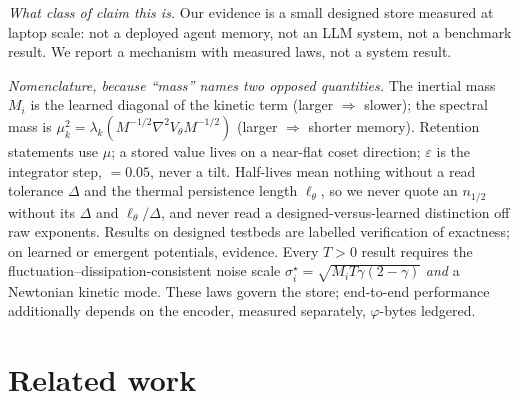 \emph{What class of claim this is.} Our evidence is a small designed store measured at laptop scale: not a deployed agent memory, not an LLM system, not a benchmark result. We report a mechanism with measured laws, not a system result.

{\scriptsize\emph{Nomenclature, because ``mass'' names two opposed quantities.} The inertial mass $M_i$ is the learned diagonal of the kinetic term (larger $\Rightarrow$ slower); the spectral mass is $\mu_k^2=\lambda_k(M^{-1/2}\nabla^2V_\theta M^{-1/2})$ (larger $\Rightarrow$ shorter memory). Retention statements use $\mu$; a stored value lives on a near-flat coset direction; $\varepsilon$ is the integrator step, $=0.05$, never a tilt. Half-lives mean nothing without a read tolerance $\Delta$ and the thermal persistence length $\ell_\theta$, so we never quote an $n_{1/2}$ without its $\Delta$ and $\ell_\theta/\Delta$, and never read a designed-versus-learned distinction off raw exponents. Results on designed testbeds are labelled verification of exactness; on learned or emergent potentials, evidence. Every $T>0$ result requires the fluctuation--dissipation-consistent noise scale $\sigma^\star_i=\sqrt{M_iT\gamma(2-\gamma)}$ \emph{and} a Newtonian kinetic mode. These laws govern the store; end-to-end performance additionally depends on the encoder, measured separately, $\varphi$-bytes ledgered.\par}

\section{Related work}\label{sec:related}

